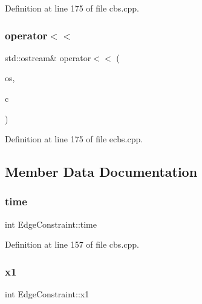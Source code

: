 Definition at line 175 of file cbs.\+cpp.

\mbox{\label{struct_edge_constraint_a94c3e6e61fef6fe98974b7bcf1b2245e}} 
\subsubsection{\texorpdfstring{operator$<$$<$}{operator<<}\hspace{0.1cm}{\footnotesize\ttfamily [2/2]}}
{\footnotesize\ttfamily std\+::ostream\& operator$<$$<$ (\begin{DoxyParamCaption}\item[{std\+::ostream \&}]{os,  }\item[{const \hyperlink{struct_edge_constraint}{Edge\+Constraint} \&}]{c }\end{DoxyParamCaption})\hspace{0.3cm}{\ttfamily [friend]}}



Definition at line 175 of file ecbs.\+cpp.



\subsection{Member Data Documentation}
\mbox{\label{struct_edge_constraint_aa4a694babdcc422c4914ec768994119b}} 
\subsubsection{\texorpdfstring{time}{time}}
{\footnotesize\ttfamily int Edge\+Constraint\+::time}



Definition at line 157 of file cbs.\+cpp.

\mbox{\label{struct_edge_constraint_a71519eb54d966deeed3ac62bfabb6248}} 
\subsubsection{\texorpdfstring{x1}{x1}}
{\footnotesize\ttfamily int Edge\+Constraint\+::x1}



